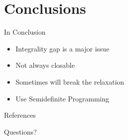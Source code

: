 \documentclass{beamer}
\begin{document}
\section{Conclusions}

\begin{frame}{In Conclusion}
\begin{itemize}
	\item Integrality gap is a major issue
	\item Not always closable
	\item Sometimes will break the relaxation
	\item Use Semidefinite Programming
\end{itemize}
\end{frame}

\begin{frame}[allowframebreaks]{References}


\end{frame}

\begin{frame}{Questions?}
\end{frame}
\end{document}
